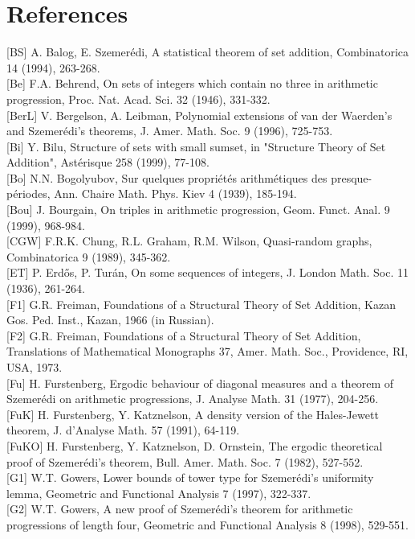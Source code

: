 \documentclass[10pt]{article}
\begin{document}
\section*{References}
[BS] A. Balog, E. Szemerédi, A statistical theorem of set addition, Combinatorica 14 (1994), 263-268.\\[0pt]
[Be] F.A. Behrend, On sets of integers which contain no three in arithmetic progression, Proc. Nat. Acad. Sci. 32 (1946), 331-332.\\[0pt]
[BerL] V. Bergelson, A. Leibman, Polynomial extensions of van der Waerden's and Szemerédi's theorems, J. Amer. Math. Soc. 9 (1996), 725-753.\\[0pt]
[Bi] Y. Bilu, Structure of sets with small sumset, in "Structure Theory of Set Addition", Astérisque 258 (1999), 77-108.\\[0pt]
[Bo] N.N. Bogolyubov, Sur quelques propriétés arithmétiques des presque-périodes, Ann. Chaire Math. Phys. Kiev 4 (1939), 185-194.\\[0pt]
[Bou] J. Bourgain, On triples in arithmetic progression, Geom. Funct. Anal. 9 (1999), 968-984.\\[0pt]
[CGW] F.R.K. Chung, R.L. Graham, R.M. Wilson, Quasi-random graphs, Combinatorica 9 (1989), 345-362.\\[0pt]
[ET] P. Erdős, P. Turán, On some sequences of integers, J. London Math. Soc. 11 (1936), 261-264.\\[0pt]
[F1] G.R. Freiman, Foundations of a Structural Theory of Set Addition, Kazan Gos. Ped. Inst., Kazan, 1966 (in Russian).\\[0pt]
[F2] G.R. Freiman, Foundations of a Structural Theory of Set Addition, Translations of Mathematical Monographs 37, Amer. Math. Soc., Providence, RI, USA, 1973.\\[0pt]
[Fu] H. Furstenberg, Ergodic behaviour of diagonal measures and a theorem of Szemerédi on arithmetic progressions, J. Analyse Math. 31 (1977), 204-256.\\[0pt]
[FuK] H. Furstenberg, Y. Katznelson, A density version of the Hales-Jewett theorem, J. d'Analyse Math. 57 (1991), 64-119.\\[0pt]
[FuKO] H. Furstenberg, Y. Katznelson, D. Ornstein, The ergodic theoretical proof of Szemerédi's theorem, Bull. Amer. Math. Soc. 7 (1982), 527-552.\\[0pt]
[G1] W.T. Gowers, Lower bounds of tower type for Szemerédi's uniformity lemma, Geometric and Functional Analysis 7 (1997), 322-337.\\[0pt]
[G2] W.T. Gowers, A new proof of Szemerédi's theorem for arithmetic progressions of length four, Geometric and Functional Analysis 8 (1998), 529-551.\\[0pt]
\end{document}
